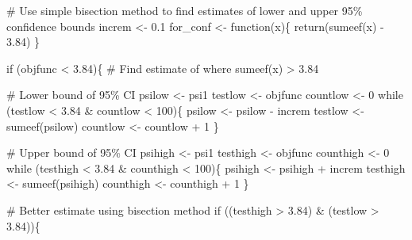 \documentclass[
  10pt,
  a4paper,
]{book}
\newenvironment{Shaded}{\begin{snugshade}}{\end{snugshade}}
\newcommand{\CommentTok}[1]{\textcolor[rgb]{0.37,0.37,0.37}{#1}}
\newcommand{\ControlFlowTok}[1]{\textcolor[rgb]{0.00,0.46,0.62}{#1}}
\newcommand{\DecValTok}[1]{\textcolor[rgb]{0.68,0.00,0.00}{#1}}
\newcommand{\FloatTok}[1]{\textcolor[rgb]{0.68,0.00,0.00}{#1}}
\newcommand{\FunctionTok}[1]{\textcolor[rgb]{0.28,0.35,0.67}{#1}}
\newcommand{\NormalTok}[1]{\textcolor[rgb]{0.00,0.46,0.62}{#1}}
\newcommand{\OtherTok}[1]{\textcolor[rgb]{0.00,0.46,0.62}{#1}}
\newcommand{\SpecialCharTok}[1]{\textcolor[rgb]{0.37,0.37,0.37}{#1}}
\begin{document}
\begin{Shaded}
\begin{Highlighting}[]
\CommentTok{\# Use simple bisection method to find estimates of lower and upper 95\% confidence bounds}
\NormalTok{increm }\OtherTok{\textless{}{-}} \FloatTok{0.1}
\NormalTok{for\_conf }\OtherTok{\textless{}{-}} \ControlFlowTok{function}\NormalTok{(x)\{}
  \FunctionTok{return}\NormalTok{(}\FunctionTok{sumeef}\NormalTok{(x) }\SpecialCharTok{{-}} \FloatTok{3.84}\NormalTok{)}
\NormalTok{\}}

\ControlFlowTok{if}\NormalTok{ (objfunc }\SpecialCharTok{\textless{}} \FloatTok{3.84}\NormalTok{)\{}
  \CommentTok{\# Find estimate of where sumeef(x) \textgreater{} 3.84}

  \CommentTok{\# Lower bound of 95\% CI}
\NormalTok{  psilow }\OtherTok{\textless{}{-}}\NormalTok{ psi1}
\NormalTok{  testlow }\OtherTok{\textless{}{-}}\NormalTok{ objfunc}
\NormalTok{  countlow }\OtherTok{\textless{}{-}} \DecValTok{0}
  \ControlFlowTok{while}\NormalTok{ (testlow }\SpecialCharTok{\textless{}} \FloatTok{3.84} \SpecialCharTok{\&}\NormalTok{ countlow }\SpecialCharTok{\textless{}} \DecValTok{100}\NormalTok{)\{}
\NormalTok{    psilow }\OtherTok{\textless{}{-}}\NormalTok{ psilow }\SpecialCharTok{{-}}\NormalTok{ increm}
\NormalTok{    testlow }\OtherTok{\textless{}{-}} \FunctionTok{sumeef}\NormalTok{(psilow)}
\NormalTok{    countlow }\OtherTok{\textless{}{-}}\NormalTok{ countlow }\SpecialCharTok{+} \DecValTok{1}
\NormalTok{  \}}

  \CommentTok{\# Upper bound of 95\% CI}
\NormalTok{  psihigh }\OtherTok{\textless{}{-}}\NormalTok{ psi1}
\NormalTok{  testhigh }\OtherTok{\textless{}{-}}\NormalTok{ objfunc}
\NormalTok{  counthigh }\OtherTok{\textless{}{-}} \DecValTok{0}
  \ControlFlowTok{while}\NormalTok{ (testhigh }\SpecialCharTok{\textless{}} \FloatTok{3.84} \SpecialCharTok{\&}\NormalTok{ counthigh }\SpecialCharTok{\textless{}} \DecValTok{100}\NormalTok{)\{}
\NormalTok{    psihigh }\OtherTok{\textless{}{-}}\NormalTok{ psihigh }\SpecialCharTok{+}\NormalTok{ increm}
\NormalTok{    testhigh }\OtherTok{\textless{}{-}} \FunctionTok{sumeef}\NormalTok{(psihigh)}
\NormalTok{    counthigh }\OtherTok{\textless{}{-}}\NormalTok{ counthigh }\SpecialCharTok{+} \DecValTok{1}
\NormalTok{  \}}

  \CommentTok{\# Better estimate using bisection method}
  \ControlFlowTok{if}\NormalTok{ ((testhigh }\SpecialCharTok{\textgreater{}} \FloatTok{3.84}\NormalTok{) }\SpecialCharTok{\&}\NormalTok{ (testlow }\SpecialCharTok{\textgreater{}} \FloatTok{3.84}\NormalTok{))\{}


\end{Highlighting}
\end{Shaded}
\end{document}
